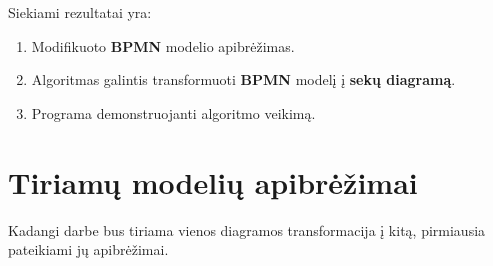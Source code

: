 \documentclass{VUMIFInfBakalaurinis}
\begin{document}
Siekiami rezultatai yra:
\begin{enumerate}
	\item Modifikuoto \textbf{BPMN} modelio apibrėžimas.
	\item Algoritmas galintis transformuoti \textbf{BPMN} modelį į \textbf{sekų diagramą}.
	\item Programa demonstruojanti algoritmo veikimą.
\end{enumerate}


\section{Tiriamų modelių apibrėžimai}
Kadangi darbe bus tiriama vienos diagramos transformacija į kitą, pirmiausia pateikiami jų apibrėžimai.

\end{document}
